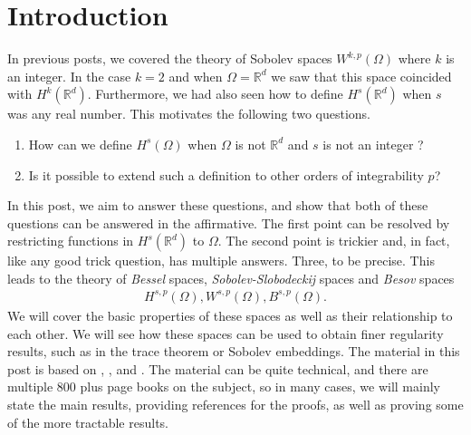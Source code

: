 \documentclass[
    a4paper,
    DIV=14,
    abstract=true,
    numbers=noenddot
]
{scrartcl}
\theoremstyle{definition}
\newcommand{\R}{\mathbb{R}}
\begin{document}
\section{Introduction}
In previous posts, we covered the theory of Sobolev spaces $W^{k,p}(\Omega )$ where $k$ is an integer. In the case $k=2$ and when $\Omega =\R^d$ we saw that this space coincided with $H^k(\R^d)$. Furthermore, we had also seen how to define $H^s(\R^d)$ when $s$ was any real number. This motivates the following two questions.
\begin{enumerate}
  \item How can we define $H^s(\Omega )$  when $\Omega $ is not $\R^d$ and $s$ is not an integer ?
  \item Is it possible to extend such a definition to other orders of integrability $p$?
\end{enumerate}
In this post, we aim to answer these questions, and show that both of these questions can be answered in the affirmative. The first point can be resolved by restricting functions in $H^s(\R^d)$ to $\Omega $. The second point is trickier and, in fact, like any good trick question, has multiple answers. Three, to be precise. This leads to the theory of \emph{Bessel} spaces, \emph{Sobolev-Slobodeckij} spaces and \emph{Besov} spaces
\begin{align*}
  H^{s,p}(\Omega ),W^{s,p}(\Omega ),B^{s,p}(\Omega ).
\end{align*}
We will cover the basic properties of these spaces as well as their relationship to each other. We will see how these spaces can be used to obtain finer regularity results, such as in the trace theorem or Sobolev embeddings. The material in this post is based on \cite{agranovich2015sobolev}, \cite{di2012hitchhiker's}, \cite{triebel1992theory} and \cite{stein1970singular}. The material can be quite technical, and there are multiple $800$ plus page books on the subject, so in many cases, we will mainly state the main results, providing references for the proofs, as well as proving some of the more tractable results.
\end{document}
